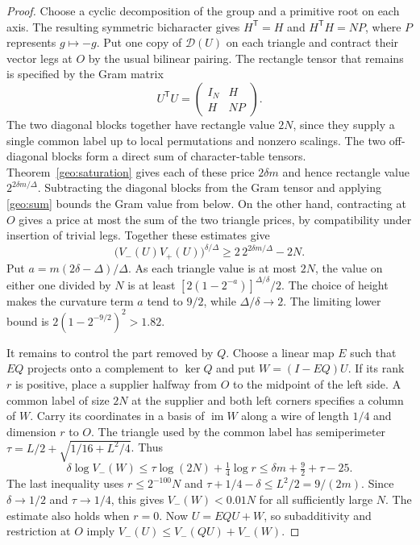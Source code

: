 \begin{proof}
Choose a cyclic decomposition of the group and a primitive root on
each axis. The resulting symmetric bicharacter gives $H^{\mathsf T}=H$
and $H^{\mathsf T}H=NP$, where $P$ represents $g\mapsto-g$.
Put one copy of $\mathcal D(U)$ on each triangle and contract their
vector legs at $O$ by the usual bilinear pairing. The rectangle tensor
that remains is specified by the Gram matrix
\[
 U^{\mathsf T}U=\begin{pmatrix} I_N&H\\ H&NP\end{pmatrix}.
\]
The two diagonal blocks together have rectangle value $2N$, since
they supply a single common label up to local permutations and
nonzero scalings. The two off-diagonal blocks form a direct sum of
character-table tensors. Theorem~\ref{geo:saturation} gives each of
these price $2\delta m$ and hence rectangle value $2^{2\delta m/\Delta}$.
Subtracting the diagonal blocks from the Gram tensor and applying
\eqref{geo:sum} bounds the Gram value from below. On the other hand,
contracting at $O$ gives a price at most the sum of the two triangle
prices, by compatibility under insertion of trivial legs. Together
these estimates give
\[
   \bigl(V_-(U)V_+(U)\bigr)^{\delta/\Delta}
       \ge 2\,2^{2\delta m/\Delta}-2N .
\]
Put $a=m(2\delta-\Delta)/\Delta$. As each triangle value is at most
$2N$, the value on either one divided by $N$ is at least
$[2(1-2^{-a})]^{\Delta/\delta}/2$. The choice of height makes the
curvature term $a$ tend to $9/2$, while $\Delta/\delta\to2$.
The limiting lower bound is $2(1-2^{-9/2})^2>1.82$.

It remains to control the part removed by $Q$. Choose a linear map $E$
such that $EQ$ projects onto a complement to $\ker Q$ and put
$W=(I-EQ)U$. If its rank $r$ is positive, place a supplier halfway
from $O$ to the midpoint of the left side. A common label of size
$2N$ at the supplier and both left corners specifies a column of $W$.
Carry its coordinates in a basis of $\operatorname{im}W$ along a wire
of length $1/4$ and dimension $r$ to $O$. The triangle used by the
common label has semiperimeter
$\tau=L/2+\sqrt{1/16+L^2/4}$. Thus
\[
 \delta\log V_-(W)
 \le \tau\log(2N)+\tfrac14\log r
 \le \delta m+\tfrac92+\tau-25 .
\]
The last inequality uses $r\le2^{-100}N$ and
$\tau+1/4-\delta\le L^2/2=9/(2m)$. Since $\delta\to1/2$ and
$\tau\to1/4$, this gives $V_-(W)<0.01N$ for all sufficiently
large $N$. The estimate also holds when $r=0$. Now $U=EQU+W$,
so subadditivity and restriction at $O$ imply
$V_-(U)\le V_-(QU)+V_-(W)$.
\end{proof}

